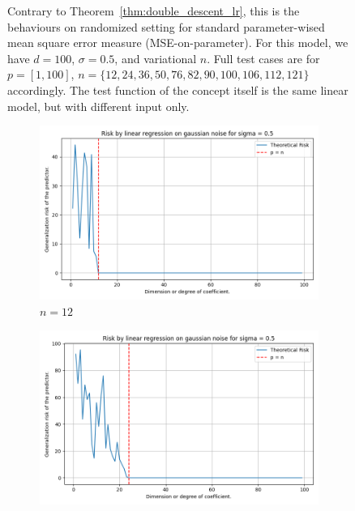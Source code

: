 \documentclass{article}
\begin{document}
\begin{figure}[htb]
  \caption{Contrary to Theorem~\ref{thm:double_descent_lr}, this is the behaviours on randomized setting for standard parameter-wised mean square error measure (MSE-on-parameter). For this model, we have $d=100$, $\sigma = 0.5$, and variational $n$. Full test cases are for $p=[1,100]$, $n=\{12,24,36,50,76,82,90,100,106,112,121\}$ accordingly. The test function of the concept itself is the same linear model, but with different input only.}
  \label{fig:11grid2}
\end{figure}

\begin{figure}[htb]
  \centering
  \newcommand{\imgwidth}{0.22\textwidth}

  \begin{subfigure}[b]{\imgwidth}
    \includegraphics[width=\linewidth]{img/descent_devel_t1.png}
    \caption{$n=12$}\label{fig:1a21}
  \end{subfigure}%
  \hfill
  \begin{subfigure}[b]{\imgwidth}
    \includegraphics[width=\linewidth]{img/descent_devel_t2.png}

\end{subfigure}
\end{figure}
\end{document}
